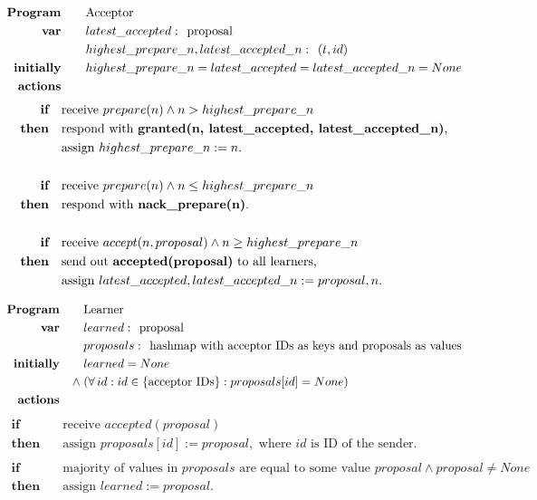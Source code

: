 \documentclass[10pt,letter]{article}
\begin{document}
\pagebreak

\begin{align*}
\textrm{\textbf{Program}} \qquad & \textrm{Acceptor}
\\
\textrm{\textbf{var}} \qquad & latest\_accepted\; \textrm{:\; proposal}
\\ & highest\_prepare\_n, latest\_accepted\_n\; \textrm{:\; $(t, id)$}
\\
\textrm{\textbf{initially}} \qquad & highest\_prepare\_n = latest\_accepted = latest\_accepted\_n = None
\\
\textrm{\textbf{actions}} \qquad &
\end{align*}
\begin{align*}
\textbf{if}\quad &\textrm{receive } prepare(n) \land n > highest\_prepare\_n
\\ \textbf{then}\quad &\textrm{respond with \textbf{granted(n, latest\_accepted, latest\_accepted\_n)},}
\\ &\textrm{assign } highest\_prepare\_n := n.
\\\\
\textbf{if}\quad &\textrm{receive } prepare(n) \land n \leq highest\_prepare\_n
\\ \textbf{then}\quad &\textrm{respond with \textbf{nack\_prepare(n)}.}
\\\\
\textbf{if}\quad &\textrm{receive } accept(n, proposal) \land n \geq highest\_prepare\_n
\\ \textbf{then}\quad &\textrm{send out \textbf{accepted(proposal)} to all learners,}
\\ &\textrm{assign } latest\_accepted, latest\_accepted\_n := proposal, n.
\end{align*}

\pagebreak

\begin{align*}
\textrm{\textbf{Program}} \qquad & \textrm{Learner}
\\
\textrm{\textbf{var}} \qquad & learned\; \textrm{:\; proposal}
\\ & proposals\; \textrm{:\; hashmap with acceptor IDs as keys and proposals as values}
\\
\textrm{\textbf{initially}} \qquad & learned = None
\\
\land\; & (\forall\, id : id \in \{\textrm{acceptor IDs}\} : proposals[id] = None)
\\
\textrm{\textbf{actions}} \qquad &
\end{align*}
\begin{align*}
\textbf{if}\quad &\textrm{receive } accepted(proposal)
\\ \textbf{then}\quad &\textrm{assign } proposals[id] := proposal, \textrm{ where $id$ is ID of the sender.}
\\\\
\textbf{if}\quad &\textrm{majority of values in $proposals$ are equal to some value $proposal$} \land proposal \neq None
\\ \textbf{then}\quad &\textrm{assign } learned := proposal.
\end{align*}
\end{document}
